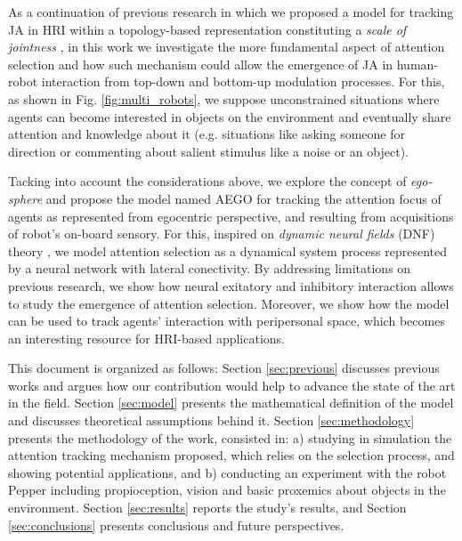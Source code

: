 \documentclass[letterpaper, 10 pt, conference]{ieeeconf}  %
\begin{document}
	As a continuation of previous research in which we proposed a model for tracking JA in HRI within a topology-based representation constituting a \textit{scale of jointness} \cite{chame2023top}, in this work we investigate the more fundamental aspect of attention selection and how such mechanism could allow the emergence of JA in human-robot interaction from top-down and bottom-up modulation processes. For this, as shown in Fig. \ref{fig:multi_robots}, we suppose unconstrained situations where agents can become interested in objects on the environment and eventually share attention and knowledge about it (e.g. situations like asking someone for direction or commenting about salient stimulus like a noise or an object). 
	
	Tacking into account the considerations above, we explore the concept of \textit{ego-sphere} \cite{albus1991} and propose the model named AEGO for tracking the attention focus of agents as represented from egocentric perspective, and resulting from acquisitions of robot's on-board sensory. For this, inspired on \textit{dynamic neural fields} (DNF) theory \cite{amari1977}, we model attention selection as a dynamical system process represented by a neural network with lateral conectivity. By addressing limitations on previous research, we show how neural exitatory and inhibitory interaction allows to study the emergence of attention selection. Moreover, we show how the model can be used to track agents' interaction with peripersonal space, which becomes an interesting resource for HRI-based applications. 
	
	  	  
	This document is organized as follows: Section \ref{sec:previous} discusses previous works and argues how our contribution would help to advance the state of the art in the field. Section \ref{sec:model} presents the mathematical definition of the model and discusses theoretical assumptions behind it. Section \ref{sec:methodology} presents the methodology of the work, consisted in: a) studying in simulation the attention tracking mechanism proposed, which relies on the selection process, and showing potential applications, and b) conducting an experiment with the robot Pepper including propioception, vision and basic proxemics about objects in the environment. Section \ref{sec:results} reports the study’s results, and Section \ref{sec:conclusions} presents conclusions and future perspectives.
	  
\end{document}
